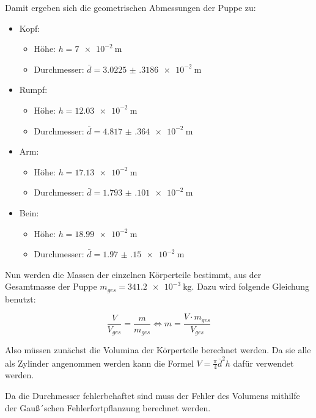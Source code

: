 Damit ergeben sich die geometrischen Abmessungen der Puppe zu:

\begin{itemize}
  \item Kopf:
    \begin{itemize}
      \item Höhe: $h = \SI{7e-2}{\meter}$
      \item Durchmesser: $\bar{d} = \SI{3.0225(3186)e-2}{\meter}$
    \end{itemize}
  \item Rumpf:
    \begin{itemize}
      \item Höhe: $h = \SI{12.03e-2}{\meter}$
      \item Durchmesser: $\bar{d} = \SI{4.817(364)e-2}{\meter}$
    \end{itemize}
  \item Arm:
    \begin{itemize}
      \item Höhe: $h = \SI{17.13e-2}{\meter}$
      \item Durchmesser: $\bar{d} = \SI{1.793(101)e-2}{\meter}$
    \end{itemize}
  \item Bein:
    \begin{itemize}
      \item Höhe: $h = \SI{18.99e-2}{\meter}$
      \item Durchmesser: $\bar{d} = \SI{1.97(15)e-2}{\meter}$
    \end{itemize}
\end{itemize}

Nun werden die Massen der einzelnen Körperteile bestimmt, aus der Gesamtmasse der
Puppe $m_{ges} = \SI{341.2e-3}{\kilo\gram}$. Dazu wird folgende Gleichung benutzt:

\begin{equation}
  \frac{V}{V_{ges}} = \frac{m}{m_{ges}} \iff m = \frac{V \cdot m_{ges}}{V_{ges}}
  \label{eq:13}
\end{equation}

Also müssen zunächst die Volumina der Körperteile berechnet werden. Da sie alle als
Zylinder angenommen werden kann die Formel $V = \frac{\pi}{4} \bar{d}^2 h$ dafür verwendet
werden.

Da die Durchmesser fehlerbehaftet sind muss der Fehler des Volumens mithilfe der
Gauß´schen Fehlerfortpflanzung berechnet werden.\\\\

